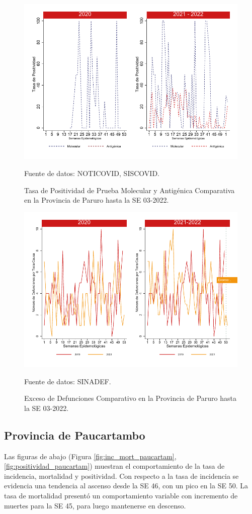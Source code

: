 \documentclass[12pt,a4paper,openany]{book}
\begin{document}
		\begin{figure}[h]
			\caption{Tasa de Positividad de Prueba Molecular y Antigénica Comparativa en la Provincia de Paruro hasta la SE 03-2022.}\label{fig:positividad_paruro}
			\begin{center}
				\includegraphics[width=0.7\linewidth]{../figuras/positividad_20_21_10}
			\end{center}
			{\footnotesize {Fuente de datos: NOTICOVID, SISCOVID.}}
		\end{figure}
		
		\begin{figure}[h]
			\caption{Exceso de Defunciones Comparativo en la Provincia de Paruro hasta la SE 03-2022.}\label{fig:exceso_paruro}
			\begin{center}
				\includegraphics[width=0.7\linewidth]{../figuras/exceso_10}
			\end{center}
			{\footnotesize {Fuente de datos: SINADEF.}}
		\end{figure}
		
		
		\clearpage
		
		\subsection*{Provincia de Paucartambo}
		\noindent Las figuras de abajo (Figura \ref{fig:inc_mort_paucartam}, \ref{fig:positividad_paucartam}) muestran el comportamiento de la tasa de incidencia, mortalidad y positividad. Con respecto a la tasa de incidencia se evidencia una tendencia al ascenso desde la SE 46, con un pico en la SE 50.  
		La tasa de mortalidad presentó un comportamiento variable con incremento de muertes para la SE 45, para luego mantenerse en descenso.  
		
\end{document}

